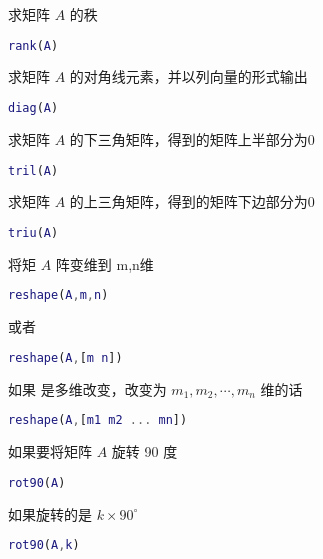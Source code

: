 \documentclass{ctexart}
\begin{document}
 
 求矩阵 $A$ 的秩
 \begin{lstlisting}[language=matlab]
 rank(A)
 \end{lstlisting}
 
 求矩阵 $A$ 的对角线元素，并以列向量的形式输出
 \begin{lstlisting}[language=matlab]
 diag(A)
 \end{lstlisting}
 
 求矩阵 $A$ 的下三角矩阵，得到的矩阵上半部分为0
 \begin{lstlisting}[language=matlab]
 tril(A)
 \end{lstlisting}
 
 求矩阵 $A$ 的上三角矩阵，得到的矩阵下边部分为0
 \begin{lstlisting}[language=matlab]
 triu(A)
 \end{lstlisting}
 
 将矩 $A$ 阵变维到 m,n维
 \begin{lstlisting}[language=matlab]
 reshape(A,m,n)
 \end{lstlisting}
 或者
 \begin{lstlisting}[language=matlab]
 reshape(A,[m n])
 \end{lstlisting}
 如果 是多维改变，改变为 $m_1,m_2,\cdots,m_n$ 维的话
 \begin{lstlisting}[language=matlab]
 reshape(A,[m1 m2 ... mn])
 \end{lstlisting}
 
 如果要将矩阵 $A$ 旋转 90 度
 \begin{lstlisting}[language=matlab]
 rot90(A)
 \end{lstlisting}
 如果旋转的是 $k\times 90^\circ$
 \begin{lstlisting}[language=matlab]
 rot90(A,k)
 \end{lstlisting}
 
 
 
 
 
 
 
 
 
 
 
 
 
 
 
 
 
 \begin{lstlisting}[language=matlab]
 
 \end{lstlisting}
\end{document}
